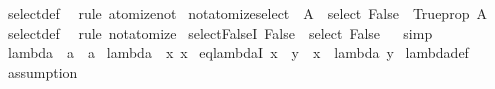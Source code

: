 \begin{isabellebody}
%
\isadelimproof
%
\endisadelimproof
%
\isatagproof
{}\isamarkupfalse%
\ select{\isacharunderscore}{\kern0pt}def\ \isamarkupfalse%
\ {\isacharparenleft}{\kern0pt}rule\ atomize{\isacharunderscore}{\kern0pt}not{\isacharparenright}{\kern0pt}%
\endisatagproof
{\isafoldproof}%
%
\isadelimproof
\isanewline
%
\endisadelimproof
\isanewline
{}\isamarkupfalse%
\ not{\isacharunderscore}{\kern0pt}atomize{\isacharunderscore}{\kern0pt}select{\isacharcolon}{\kern0pt}\ {\isachardoublequoteopen}{\isacharparenleft}{\kern0pt}{\isasymnot}\ A\ {\isasymLongrightarrow}\ select\ False{\isacharparenright}{\kern0pt}\ {\isasymequiv}\ Trueprop\ A{\isachardoublequoteclose}\isanewline
%
\isadelimproof
%
\endisadelimproof
%
\isatagproof
{}\isamarkupfalse%
\ select{\isacharunderscore}{\kern0pt}def\ \isamarkupfalse%
\ {\isacharparenleft}{\kern0pt}rule\ not{\isacharunderscore}{\kern0pt}atomize{\isacharparenright}{\kern0pt}%
\endisatagproof
{\isafoldproof}%
%
\isadelimproof
\isanewline
%
\endisadelimproof
\isanewline
{}\isamarkupfalse%
\ select{\isacharunderscore}{\kern0pt}FalseI{\isacharcolon}{\kern0pt}\ {\isachardoublequoteopen}False\ {\isasymLongrightarrow}\ select\ False{\isachardoublequoteclose}%
\isadelimproof
\ %
\endisadelimproof
%
\isatagproof
{}\isamarkupfalse%
\ simp%
\endisatagproof
{\isafoldproof}%
%
\isadelimproof
%
\endisadelimproof
\isanewline
\isanewline
{}\isamarkupfalse%
\ lambda\ {\isacharcolon}{\kern0pt}{\isacharcolon}{\kern0pt}\ {\isachardoublequoteopen}{\isacharprime}{\kern0pt}a\ {\isasymRightarrow}\ {\isacharprime}{\kern0pt}a{\isachardoublequoteclose}\ \isanewline
{\isachardoublequoteopen}lambda\ {\isacharequal}{\kern0pt}\ {\isacharparenleft}{\kern0pt}{\isasymlambda}x{\isachardot}{\kern0pt}\ x{\isacharparenright}{\kern0pt}{\isachardoublequoteclose}\isanewline
\isanewline
{}\isamarkupfalse%
\ eq{\isacharunderscore}{\kern0pt}lambdaI{\isacharcolon}{\kern0pt}\ {\isachardoublequoteopen}x\ {\isasymequiv}\ y\ {\isasymLongrightarrow}\ x\ {\isasymequiv}\ lambda\ y{\isachardoublequoteclose}\isanewline
%
\isadelimproof
%
\endisadelimproof
%
\isatagproof
{}\isamarkupfalse%
\ lambda{\isacharunderscore}{\kern0pt}def\ \isamarkupfalse%
\ assumption%
\endisatagproof
{\isafoldproof}%
%
\isadelimproof
%
\endisadelimproof
%
\isadelimdocument
%
\endisadelimdocument
%
\isatagdocument
%
\isamarkuptrue%
%
\endisatagdocument
{\isafolddocument}%
%
\isadelimdocument

\end{isabellebody}
